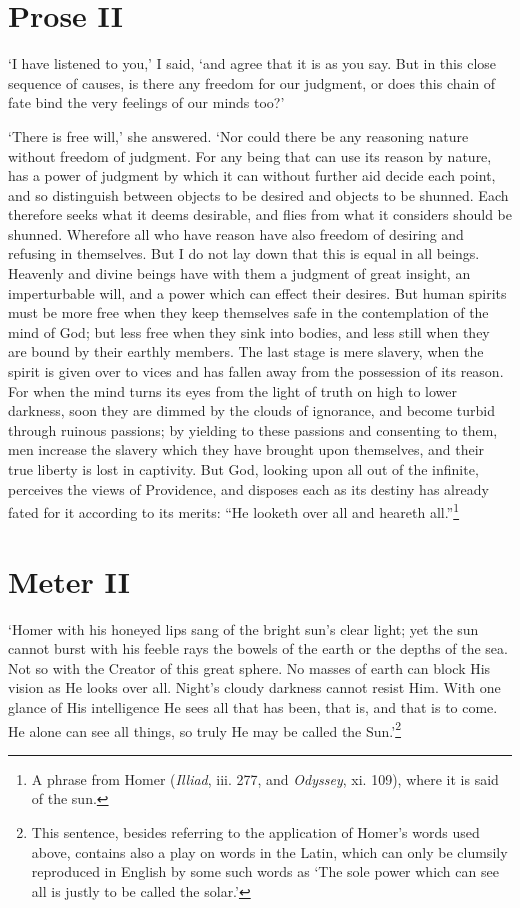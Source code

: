 \section*{Prose II}

`I have listened to you,' I said, `and agree that it is as you say.
But in this close sequence of causes, is there any freedom for our
judgment, or does this chain of fate bind the very feelings of our
minds too?'

`There is free will,' she answered. `Nor could there be any reasoning
nature without freedom of judgment. For any being that can use its
reason by nature, has a power of judgment by which it can without
further aid decide each point, and so distinguish between objects to
be desired and objects to be shunned. Each therefore seeks what it
deems desirable, and flies from what it considers should be shunned.
Wherefore all who have reason have also freedom of desiring and
refusing in themselves. But I do not lay down that this is equal in
all beings. Heavenly and divine beings have with them a judgment of
great insight, an imperturbable will, and a power which can effect
their desires. But human  spirits must be more free when
they keep themselves safe in the contemplation of the mind of God; but
less free when they sink into bodies, and less still when they are
bound by their earthly members. The last stage is mere slavery, when
the spirit is given over to vices and has fallen away from the
possession of its reason. For when the mind turns its eyes from the
light of truth on high to lower darkness, soon they are dimmed by the
clouds of ignorance, and become turbid through ruinous passions; by
yielding to these passions and consenting to them, men increase the
slavery which they have brought upon themselves, and their true
liberty is lost in captivity. But God, looking upon all out of the
infinite, perceives the views of Providence, and disposes each as its
destiny has already fated for it according to its merits: ``He looketh
over all and heareth all.''\footnote{A phrase from Homer
(\textit{Illiad}, iii. 277, and \textit{Odyssey}, xi. 109), where it
is said of the sun.}

\section*{Meter II}

`Homer with his honeyed lips sang of the bright sun's clear light; yet
the sun cannot burst with his feeble rays the bowels of the earth or
the depths of the sea. Not so with the Creator of this great sphere.
No masses of earth can block His vision as He looks over all. Night's
cloudy darkness cannot resist Him. With one glance of His intelligence
He sees all that has been, that is, and that is to come.  He
alone can see all things, so truly He may be called the
Sun.'\footnote{This sentence, besides referring to the application of
Homer's words used above, contains also a play on words in the Latin,
which can only be clumsily reproduced in English by some such words as
`The sole power which can see all is justly to be called the
solar.'}

